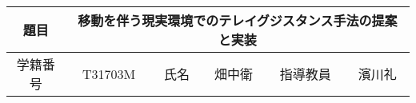 \begin{table}[h]
	\begin{center}
	{\renewcommand\arraystretch{1.3}
			\begin{tabular}{|c|c|c|c|c|c|} \hline
				題目 & \multicolumn{5}{c|}{移動を伴う現実環境でのテレイグジスタンス手法の提案と実装}\\
				\hline
			    学籍番号 & T31703M & 氏名 & 畑中衛  &  指導教員 & 濱川礼 \\
				  \hline
			\end{tabular}
	}
	\end{center}
\end{table}
